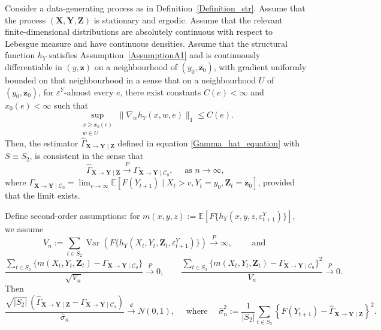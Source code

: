 \documentclass[a4paper,11pt]{article}
\newenvironment{customthm}[1]
  {\renewcommand\theinnercustomthm{#1}\innercustomthm}
  {\endinnercustomthm}
\begin{document}
\begin{customthm}{\ref{Theorem2v2}}
Consider a data-generating process as in Definition~\ref{Definition_str}. 
Assume that the process \((\mathbf X,\mathbf Y,\mathbf Z)\) is stationary 
and ergodic. Assume that the relevant finite-dimensional distributions are 
absolutely continuous with respect to Lebesgue measure and have continuous 
densities.  Assume that the structural function \(h_Y\) satisfies 
Assumption~\ref{AssumptionA1} and is continuously differentiable in 
\((y,\mathbf z)\) on a neighbourhood of \((y_0,\mathbf z_0)\), with gradient 
uniformly bounded on that neighbourhood in a sense that on a neighbourhood \(U\) of \((y_0, \textbf{z}_0)\), for \(\varepsilon^Y\)-almost every \(e\), there exist constants \(C(e)<\infty\) and \(x_0(e)<\infty\) such that
\[
    \sup_{\substack{x\ge x_0(e)\\ w\in U}}
    \|\nabla_w h_Y(x,w,e)\|_1
    \le C(e).
\]
Then, the estimator \(\hat{\Gamma}_{\textbf{X}\to\textbf{Y}\mid \textbf{Z}}\) defined in equation \eqref{Gamma_hat_equation} with \(S \equiv S_2\),  is consistent in the sense that   \begin{equation*}
   \hat{\Gamma}_{\textbf{X}\to\textbf{Y}\mid \textbf{Z}} \overset{P}{\to} \Gamma_{\textbf{X}\to\textbf{Y}\mid\mathcal{C}_0}, \quad \text{ as }n\to\infty,
  \end{equation*}
where $\Gamma_{\textbf{X}\to\textbf{Y}\mid\mathcal{C}_0} = \lim_{v\to\infty} \mathbb{E}[ F(Y_{t+1})\mid X_t>v,Y_t = y_0, \textbf{Z}_t = \textbf{z}_0]$, provided that the limit exists.

Define second-order assumptions: for \(
    m(x,y,z):=
    \mathbb E\!\left[
        F\{h_Y(x,y, z,\varepsilon^Y_{t+1})\}
    \right],
\) we assume
\[
    V_n:=\sum_{t\in S_2}    \operatorname{Var}\!\left(
        F\{h_Y(X_t,Y_t,\mathbf Z_t,\varepsilon^Y_{t+1})\}
    \right)\overset{P}{\longrightarrow}\infty, \qquad \text{ and }
\]
\[
    \frac{\sum_{t\in S_2}\{m(X_t,Y_t,\mathbf Z_t)-\Gamma_{\mathbf X\to\mathbf Y\mid\mathcal C_0}\}}
         {\sqrt{V_n}}
    \overset{P}{\longrightarrow}0,
    \qquad
    \frac{\sum_{t\in S_2}\{m(X_t,Y_t,\mathbf Z_t)-\Gamma_{\mathbf X\to\mathbf Y\mid\mathcal C_0}\}^2}
         {V_n}
    \overset{P}{\longrightarrow}0.
\]
Then
\[
    \frac{\sqrt{|S_2|}\,
    \left(
        \widehat\Gamma_{\mathbf X\to\mathbf Y\mid\mathbf Z}
        -
        \Gamma_{\mathbf X\to\mathbf Y\mid\mathcal C_0}
    \right)}
    {\widehat\sigma_n}
    \overset{d}{\to} N(0,1), \quad \text{ where }\quad
        \widehat\sigma_n^2
    :=
    \frac1{|S_2|}
    \sum_{t\in S_2}
    \left\{
        F(Y_{t+1})
        -
        \widehat\Gamma_{\mathbf X\to\mathbf Y\mid\mathbf Z}
    \right\}^2.
\]
\end{customthm}
\end{document}
